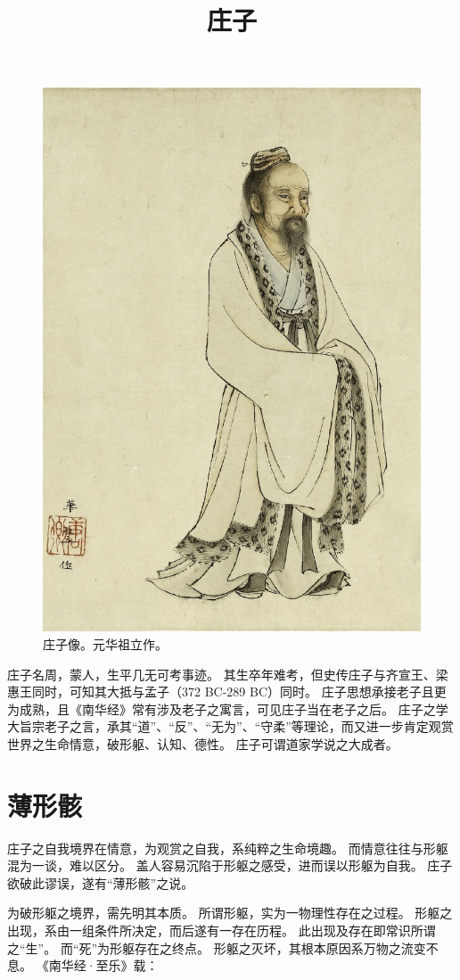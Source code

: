 \documentclass[11pt]{article}
\title{庄子}
\date{}
\begin{document}
  \maketitle

  \begin{figure}
    \centering
    \includegraphics[height=0.7\textwidth]{../Figures/ZhuangZi.jpg}
    \caption{庄子像。元华祖立作。}
  \end{figure}
  
  \newpage

  \linenumbers

庄子名周，蒙人，生平几无可考事迹。
其生卒年难考，但史传庄子与齐宣王、梁惠王同时，可知其大抵与孟子（372 BC-289 BC）同时。
庄子思想承接老子且更为成熟，且《南华经》常有涉及老子之寓言，可见庄子当在老子之后。
庄子之学大旨宗老子之言，承其“道”、“反”、“无为”、“守柔”等理论，而又进一步肯定观赏世界之生命情意，破形躯、认知、德性。
庄子可谓道家学说之大成者。

\section{薄形骸}
庄子之自我境界在情意，为观赏之自我，系纯粹之生命境趣。
而情意往往与形躯混为一谈，难以区分。
盖人容易沉陷于形躯之感受，进而误以形躯为自我。
庄子欲破此谬误，遂有“薄形骸”之说。

\newline

为破形躯之境界，需先明其本质。
所谓形躯，实为一物理性存在之过程。
形躯之出现，系由一组条件所决定，而后遂有一存在历程。
此出现及存在即常识所谓之“生”。
而“死”为形躯存在之终点。
形躯之灭坏，其根本原因系万物之流变不息。
《南华经·至乐》载：
\end{document}
